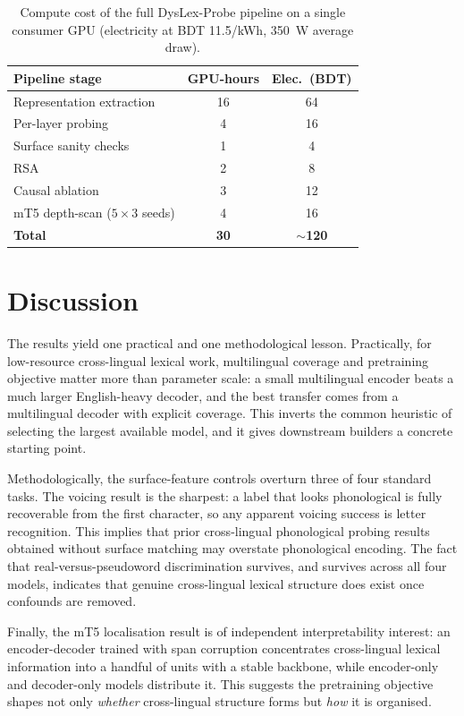 \documentclass[conference]{IEEEtran}
\begin{document}
\begin{table}[t]
\caption{Compute cost of the full DysLex-Probe pipeline on a single consumer GPU (electricity at BDT 11.5/kWh, 350~W average draw).}
\label{tab:cost}
\centering
\small
\setlength{\tabcolsep}{5pt}
\begin{tabular}{lcc}
\toprule
\textbf{Pipeline stage} & \textbf{GPU-hours} & \textbf{Elec.\ (BDT)} \\
\midrule
Representation extraction & 16 & 64 \\
Per-layer probing & 4 & 16 \\
Surface sanity checks & 1 & 4 \\
RSA & 2 & 8 \\
Causal ablation & 3 & 12 \\
mT5 depth-scan ($5\times3$ seeds) & 4 & 16 \\
\midrule
\textbf{Total} & \textbf{30} & \textbf{$\sim$120} \\
\bottomrule
\end{tabular}
\end{table}

\section{Discussion}
The results yield one practical and one methodological lesson. Practically, for low-resource cross-lingual lexical work, multilingual coverage and pretraining objective matter more than parameter scale: a small multilingual encoder beats a much larger English-heavy decoder, and the best transfer comes from a multilingual decoder with explicit coverage. This inverts the common heuristic of selecting the largest available model, and it gives downstream builders a concrete starting point.

Methodologically, the surface-feature controls overturn three of four standard tasks. The voicing result is the sharpest: a label that looks phonological is fully recoverable from the first character, so any apparent voicing success is letter recognition. This implies that prior cross-lingual phonological probing results obtained without surface matching may overstate phonological encoding. The fact that real-versus-pseudoword discrimination survives, and survives across all four models, indicates that genuine cross-lingual lexical structure does exist once confounds are removed.

Finally, the mT5 localisation result is of independent interpretability interest: an encoder-decoder trained with span corruption concentrates cross-lingual lexical information into a handful of units with a stable backbone, while encoder-only and decoder-only models distribute it. This suggests the pretraining objective shapes not only \emph{whether} cross-lingual structure forms but \emph{how} it is organised.
\end{document}
